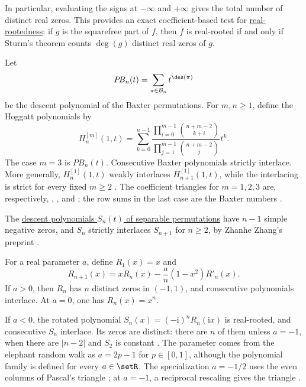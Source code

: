 In particular, evaluating the signs at $-\infty$ and $+\infty$ gives the
total number of distinct real zeros.  This provides an exact coefficient-based
test for \hyperref[realRootedPolynomial]{real-rootedness}: if $g$ is the
squarefree part of $f$, then $f$ is real-rooted if and only if Sturm's theorem
counts $\deg(g)$ distinct real zeros of $g$.

\begin{example*}
\label{baxterHoggattSturm}
Let
\[
 P\!B_n(t)=\sum_{\pi\in\mathcal B_n}t^{\des(\pi)}
\]
be the descent polynomial of the Baxter permutations.  For $m,n\geq1$,
define the Hoggatt polynomials by
\[
 H_n^{[m]}(1,t)=
 \sum_{k=0}^{n-1}
 \frac{\displaystyle\prod_{i=0}^{m-1}
       \binom{n+m-2}{k+i}}
      {\displaystyle\prod_{j=1}^{m-1}
       \binom{n+m-2}{j}}t^k.
\]
The case $m=3$ is $P\!B_n(t)$.  Consecutive Baxter polynomials strictly
interlace.  More generally, $H_n^{[1]}(1,t)$ weakly interlaces
$H_{n+1}^{[1]}(1,t)$, while the interlacing is strict for every fixed
$m\geq2$ \cite[Thms.~1.1--1.2]{FangZhangZhao2025x}.
The coefficient triangles for $m=1,2,3$ are, respectively,
, , and ; the row sums in the
last case are the Baxter numbers .
\end{example*}

\begin{example*}
The \hyperref[separableDescentRealRooted]{descent polynomials $S_n(t)$ of
separable permutations} have $n-1$ simple negative zeros, and $S_n$
strictly interlaces $S_{n+1}$ for $n\geq2$, by Zhanhe Zhang's preprint
\cite[Thm.~1.1]{Zhang2026SeparableInterlacing}.
\end{example*}

\begin{example*}
\label{elephantPolynomials}
For a real parameter $a$, define $R_1(x)=x$ and
\[
 R_{n+1}(x)=xR_n(x)-\frac an(1-x^2)R'_n(x).
\]
If $a>0$, then $R_n$ has $n$ distinct zeros in $(-1,1)$, and consecutive
polynomials interlace.  At $a=0$, one has $R_n(x)=x^n$.

If $a<0$, the rotated polynomial
$S_n(x)=(-\mathrm{i})^nR_n(\mathrm{i}x)$ is real-rooted, and consecutive
$S_n$ interlace.  Its zeros are distinct: there are $n$ of them unless
$a=-1$, when there are $|n-2|$ and $S_2$ is constant
\cite[Props.~1--2]{GuerinLaulinRaschel2024x}.  The parameter comes from the
elephant random walk as $a=2p-1$ for $p\in[0,1]$, although the polynomial
family is defined for every $a\in\setR$.  The specialization $a=-1/2$ uses
the even columns of Pascal's triangle ; at $a=-1$, a
reciprocal rescaling gives the triangle .
\end{example*}


